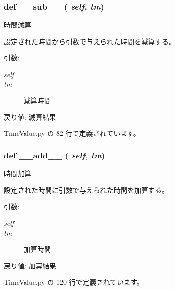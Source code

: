\subsubsection{\setlength{\rightskip}{0pt plus 5cm}def \_\-\_\-sub\_\-\_\- ( {\em self},  {\em tm})}\label{classsource__py_1_1_time_value_1_1_time_value_92f51217c100657d0bf6f97b150c0a7c}


時間減算 

設定された時間から引数で与えられた時間を減算する。

\begin{Desc}
\item[引数:]
\begin{description}
\item[{\em self}]\item[{\em tm}]減算時間\end{description}
\end{Desc}
\begin{Desc}
\item[戻り値:]減算結果 \end{Desc}


 TimeValue.py の 82 行で定義されています。
\subsubsection{\setlength{\rightskip}{0pt plus 5cm}def \_\-\_\-add\_\-\_\- ( {\em self},  {\em tm})}\label{classsource__py_1_1_time_value_1_1_time_value_e92943b217d29a45ddcbbba2f7208afc}


時間加算 

設定された時間に引数で与えられた時間を加算する。

\begin{Desc}
\item[引数:]
\begin{description}
\item[{\em self}]\item[{\em tm}]加算時間\end{description}
\end{Desc}
\begin{Desc}
\item[戻り値:]加算結果 \end{Desc}


 TimeValue.py の 120 行で定義されています。
